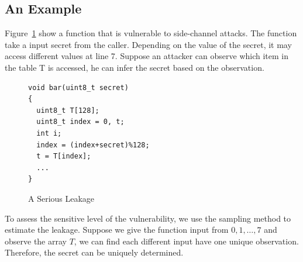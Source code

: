\subsection{An Example}
Figure~\ref{fig:example1} show a function that is vulnerable to side-channel attacks. The function take a input secret from the caller. Depending on the value of the secret, it may access different values at line 7. Suppose an attacker can observe which item in the table \textsf{T} is accessed, he can infer the secret based on the observation.
\begin{figure}[h]
  \begin{minipage}{0.6\linewidth}
    \begin{lstlisting}
void bar(uint8_t secret)
{
  uint8_t T[128];
  uint8_t index = 0, t;
  int i;
  index = (index+secret)%128;
  t = T[index];
  ...
}
\end{lstlisting}
  \end{minipage}
  \hspace{-4pt}
  \hfill
  \hspace{-4pt}
  \begin{minipage}{0.45\linewidth}
  \end{minipage}
  \caption{A Serious Leakage}\label{fig:example1}
\end{figure}

To assess the sensitive level of the vulnerability, we use the sampling method to estimate the leakage. Suppose we give the function input from $0, 1, \dots, 7$ and observe the array $T$, we can find each different input have one unique observation. Therefore, the secret can be uniquely determined.

